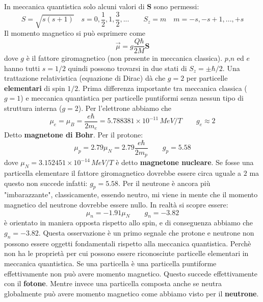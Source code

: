 In meccanica quantistica solo alcuni valori di $\mathbf{S}$ sono permessi:
\begin{equation*}
    S=\sqrt{s(s+1)} \quad s=0,\frac{1}{2},1,\frac{3}{2},... \qquad S_z=m \quad m=-s,-s+1,...,+s
\end{equation*}
Il momento magnetico si può esprimere come
\begin{equation*}
    \Vec{\mu}=g\frac{Q\hbar}{2M}\mathbf{S}
\end{equation*}
dove $g$ è il fattore giromagnetico (non presente in meccanica classica). $p$,$n$ ed $e$ hanno tutti $s=1/2$ quindi possono trovarsi in due stati di $S_z=\pm\hbar/2$. Una trattazione relativistica (equazione di Dirac) dà che $g=2$ per particelle \textbf{elementari} di spin $1/2$. Prima differenza importante tra meccanica classica ($g=1$) e meccanica quantistica per particelle puntiformi senza nessun tipo di struttura interna ($g=2$). Per l'elettrone abbiamo che 
\begin{equation*}
    \mu_e=\mu_B=\frac{e\hbar}{2m_e}=5.788381\times10^{-11}\,MeV/T \qquad g_e\approx2
\end{equation*}
Detto \textbf{magnetone di Bohr}. Per il protone:
\begin{equation*}
    \mu_p=2.79\mu_N=2.79\frac{e\hbar}{2m_p}  \qquad g_p=5.58
\end{equation*}
dove $\mu_N=3.152451\times10^{-14}\,MeV/T$ è detto \textbf{magnetone nucleare}. Se fosse una particella elementare il fattore giromagnetico dovrebbe essere circa uguale a $2$ ma questo non succede infatti: $g_p=5.58$. Per il neutrone è ancora più "imbarazzante", classicamente, essendo neutro, mi viene in mente che il momento magnetico del neutrone dovrebbe essere nullo. In realtà si scopre essere:
\begin{equation*}
    \mu_n=-1.91\mu_N \qquad g_n=-3.82
\end{equation*}
è orientato in maniera opposta rispetto allo spin, e di conseguenza abbiamo che $g_n=-3.82$. Questa osservazione è un primo segnale che protone e neutrone non possono essere oggetti fondamentali rispetto alla meccanica quantistica. Perchè non ha le proprietà per cui possono essere riconosciute particelle elementari in meccanica quantistica. Se una particella è una particella puntiforme effettivamente non può avere momento magnetico. Questo succede effettivamente con il \textbf{fotone}. Mentre invece una particella composta anche se neutra globalmente può avere momento magnetico come abbiamo visto per il \textbf{neutrone}.
